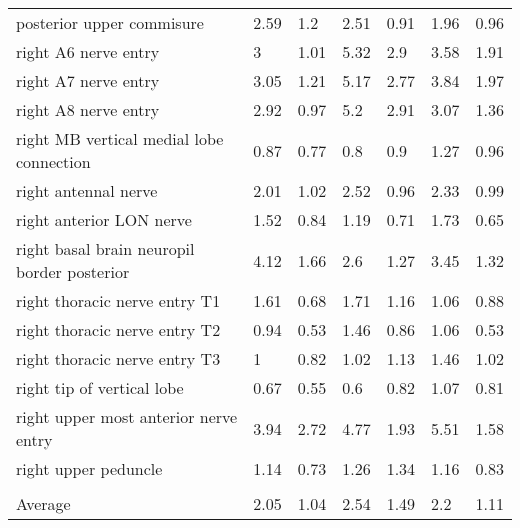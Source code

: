 \begin{tabular}{lllllll}
 posterior upper commisure                   & 2.59      & 1.2  & 2.51    & 0.91 & 1.96     & 0.96 \\
 right A6 nerve entry                        & 3         & 1.01 & 5.32    & 2.9  & 3.58     & 1.91 \\
 right A7 nerve entry                        & 3.05      & 1.21 & 5.17    & 2.77 & 3.84     & 1.97 \\
 right A8 nerve entry                        & 2.92      & 0.97 & 5.2     & 2.91 & 3.07     & 1.36 \\
 right MB vertical medial lobe connection    & 0.87      & 0.77 & 0.8     & 0.9  & 1.27     & 0.96 \\
 right antennal nerve                        & 2.01      & 1.02 & 2.52    & 0.96 & 2.33     & 0.99 \\
 right anterior LON nerve                    & 1.52      & 0.84 & 1.19    & 0.71 & 1.73     & 0.65 \\
 right basal brain neuropil border posterior & 4.12      & 1.66 & 2.6     & 1.27 & 3.45     & 1.32 \\
 right thoracic nerve entry T1               & 1.61      & 0.68 & 1.71    & 1.16 & 1.06     & 0.88 \\
 right thoracic nerve entry T2               & 0.94      & 0.53 & 1.46    & 0.86 & 1.06     & 0.53 \\
 right thoracic nerve entry T3               & 1         & 0.82 & 1.02    & 1.13 & 1.46     & 1.02 \\
 right tip of vertical lobe                  & 0.67      & 0.55 & 0.6     & 0.82 & 1.07     & 0.81 \\
 right upper most anterior nerve entry       & 3.94      & 2.72 & 4.77    & 1.93 & 5.51     & 1.58 \\
 right upper peduncle                        & 1.14      & 0.73 & 1.26    & 1.34 & 1.16     & 0.83 \\
                                             &           &      &         &      &          &      \\
 Average                                     & 2.05      & 1.04 & 2.54    & 1.49 & 2.2      & 1.11 \\
\hline
\end{tabular}